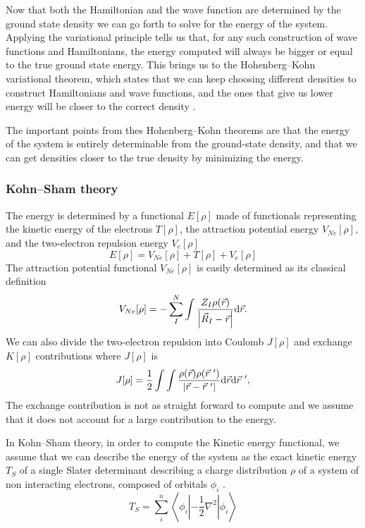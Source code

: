 \documentclass[../master_thesis.tex]{subfiles}
\begin{document}
Now that both the Hamiltonian and the wave function are determined by the ground
state density we can go forth to solve for the energy of the system. Applying the variational
principle tells us that, for any such construction of wave functions and Hamiltonians,
the energy computed will always be bigger or equal to the true ground state energy.
This brings us to the Hohenberg--Kohn variational theorem, which states that
we can keep choosing different densities to construct Hamiltonians and wave functions,
and the ones that give us lower energy will be closer to the correct density \cite{Cramer:2004}.

The important points from thes Hohenberg--Kohn theorems are that the energy of
the system is entirely determinable from the ground-state density, and that we can
get densities closer to the true density by minimizing the energy.
\subsubsection{Kohn--Sham theory}

The energy is determined by a functional $E[\rho]$ made of functionals representing
the kinetic energy of the electrons $T[\rho]$, the attraction potential energy $V_{Ne}[\rho]$,
and the two-electron repulsion energy $V_{e}[\rho]$ \cite{Sorland, PhysRev.136.B864}
\begin{equation}\label{eq:energyfunctional}
  E[\rho] = V_{Ne}[\rho] + T[\rho] + V_{e}[\rho]
\end{equation}
The attraction potential functional $V_{Ne}[\rho]$ is easily determined as its classical definition \cite{Jensen:2017}
\begin{equation}
  V_{Ne}[\rho] = - \sum^N_I \int\frac{Z_I\rho(\vec{r})}{\abs{\vec{R}_I - \vec{r}}} \text{d}\vec{r}.
\end{equation}
We can also divide the two-electron repulsion into Coulomb $J[\rho]$ and exchange $K[\rho]$ contributions
where $J[\rho]$ is
\begin{equation}
  J[\rho] = \frac{1}{2}\int\int \frac{\rho(\vec{r})\rho(\vec{r}^{~\prime})}{\abs{\vec{r} - \vec{r}^{~\prime}}} \text{d}\vec{r}\text{d}\vec{r}^{~\prime},
\end{equation}
The exchange contribution is not as straight forward to compute \cite{Jensen:2017}
and we assume that it does not account for a large contribution to the energy.

In Kohn--Sham theory, in order to compute the Kinetic energy functional, we assume
that we can describe the energy of the system as the exact kinetic energy  $T_S$ of a single Slater
determinant describing a charge distribution $\rho$ of a system of
non interacting electrons, composed of orbitals $\phi_i$ \cite{Jensen:2017}.
\begin{equation}
  T_S = \sum_{i}^n\left\langle\phi_i\left|-\frac{1}{2}\nabla^2\right|\phi_i\right\rangle
\end{equation}
\end{document}

